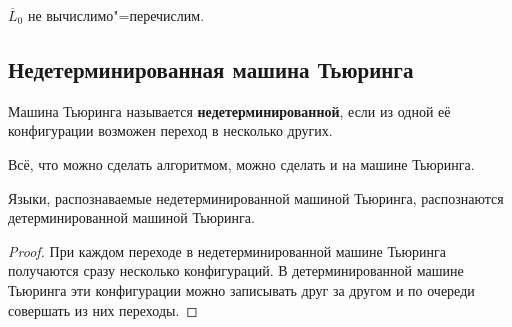 \begin{consequent}
$\overline L_0$ не вычислимо"=перечислим.
\end{consequent}

\subsection{Недетерминированная машина Тьюринга}
 Машина Тьюринга называется \textbf{недетерминированной}, если из одной её конфигурации возможен переход в несколько других.

\begin{statement}
Всё, что можно сделать алгоритмом, можно сделать и на машине Тьюринга.
\end{statement}

\begin{statement}
Языки, распознаваемые недетерминированной машиной Тьюринга, распознаются детерминированной машиной Тьюринга.
\end{statement}
\begin{proof}
При каждом переходе в недетерминированной машине Тьюринга получаются сразу несколько конфигураций.
В детерминированной машине Тьюринга эти конфигурации можно записывать друг за другом и по очереди совершать из них переходы.
\end{proof}